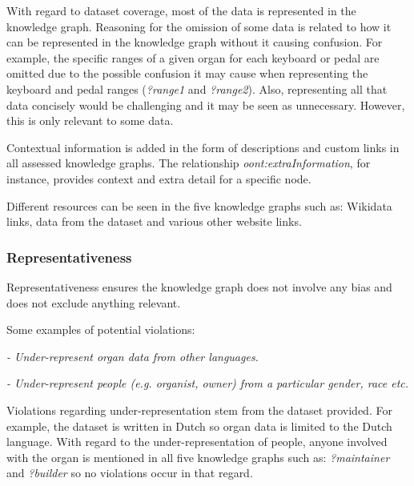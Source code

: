 With regard to dataset coverage, most of the data is represented in the knowledge graph. Reasoning for the omission of some data is related to how it can be represented in the knowledge graph without it causing confusion. For example, the specific ranges of a given organ for each keyboard or pedal are omitted due to the possible confusion it may cause when representing the keyboard and pedal ranges (\textit{?range1} and \textit{?range2}). Also, representing all that data concisely would be challenging and it may be seen as unnecessary. However, this is only relevant to some data. 

Contextual information is added in the form of descriptions and custom links in all assessed knowledge graphs. The relationship \textit{oont:extraInformation}, for instance, provides context and extra detail for a specific node. 

Different resources can be seen in the five knowledge graphs such as: Wikidata links, data from the dataset and various other website links. 

\subsubsection{Representativeness}
\hspace{0.5cm} Representativeness ensures the knowledge graph does not involve any bias and does not exclude anything relevant. \cite{knowledgegraphevaulationbook}

\noindent Some examples of potential violations: 

\vspace{-0.1cm}
\begin{displayquote}
    \textit{- Under-represent organ data from other languages.}
\end{displayquote}  
\vspace{-0.6cm}
\begin{displayquote}
     \textit{- Under-represent people (e.g. organist, owner) from a particular gender, race etc. }  
\end{displayquote}
\vspace{-0.1cm}

Violations regarding under-representation stem from the dataset provided. For example, the dataset is written in Dutch so organ data is limited to the Dutch language. With regard to the under-representation of people, anyone involved with the organ is mentioned in all five knowledge graphs such as: \textit{?maintainer} and \textit{?builder} so no violations occur in that regard.

